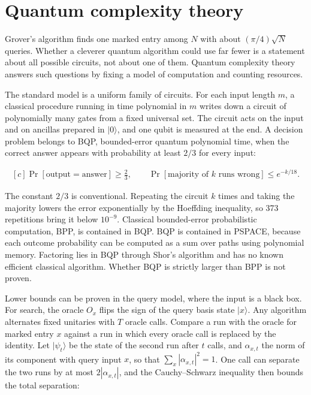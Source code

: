 \documentclass[11pt,oneside]{book}
\newenvironment{centeredalign}{\[\begin{gathered}[c]}{\end{gathered}\]}
\begin{document}
\clearpage

\section{Quantum complexity theory}

\label{topic:quantum-complexity-theory}

Grover's algorithm finds one marked entry among \(N\) with about \((\pi/4)\sqrt N\) queries. Whether a cleverer quantum algorithm could use far fewer is a statement about all possible circuits, not about one of them. Quantum complexity theory answers such questions by fixing a model of computation and counting resources.

The standard model is a uniform family of circuits. For each input length \(m\), a classical procedure running in time polynomial in \(m\) writes down a circuit of polynomially many gates from a fixed universal set. The circuit acts on the input and on ancillas prepared in \(|0\rangle\), and one qubit is measured at the end. A decision problem belongs to BQP, bounded-error quantum polynomial time, when the correct answer appears with probability at least \(2/3\) for every input:

\begin{centeredalign}
\Pr[\text{output}=\text{answer}]\geq\frac23,\qquad
\Pr[\text{majority of }k\text{ runs wrong}]\leq e^{-k/18}.
\end{centeredalign}

The constant \(2/3\) is conventional. Repeating the circuit \(k\) times and taking the majority lowers the error exponentially by the Hoeffding inequality, so 373 repetitions bring it below \(10^{-9}\). Classical bounded-error probabilistic computation, BPP, is contained in BQP. BQP is contained in PSPACE, because each outcome probability can be computed as a sum over paths using polynomial memory. Factoring lies in BQP through Shor's algorithm and has no known efficient classical algorithm. Whether BQP is strictly larger than BPP is not proven.

Lower bounds can be proven in the query model, where the input is a black box. For search, the oracle \(O_x\) flips the sign of the query basis state \(|x\rangle\). Any algorithm alternates fixed unitaries with \(T\) oracle calls. Compare a run with the oracle for marked entry \(x\) against a run in which every oracle call is replaced by the identity. Let \(|\psi_t\rangle\) be the state of the second run after \(t\) calls, and \(\alpha_{x,t}\) the norm of its component with query input \(x\), so that \(\sum_x|\alpha_{x,t}|^2=1\). One call can separate the two runs by at most \(2|\alpha_{x,t}|\), and the Cauchy--Schwarz inequality then bounds the total separation:
\end{document}
